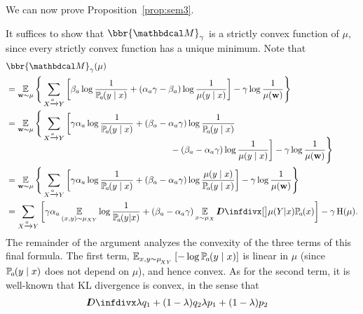 \begin{subappendices}
We can now prove         Proposition~\ref{prop:sem3}.
\begin{lproof}\label{proof:sem3}
It suffices to show that $\bbr{\dg
			  M}_\gamma$ is a strictly convex function of $\mu$,
since every strictly convex function has a unique minimum.
Note that
\begin{align*}
&   \bbr{\dg M}_\gamma(\mu) 
\\	&= \Ex_{\mat w \sim \mu} \Bigg\{   \sum_{ X \xrightarrow{\!\!a} Y  } \left[
		\beta_a \log \frac{1}{\p_a(y\mid x)} + ({\alpha_a}\gamma - \beta_a ) \log \frac{1}{\mu(y \mid x)} \right] - \gamma \log \frac{1}{\mu(\mat w)} \Bigg\} \\
	&= \Ex_{\mat w \sim \mu} \Bigg\{   \sum_{ X \xrightarrow{\!\!a} Y  } \bigg[ \gamma {\alpha_a} \log \frac{1}{\p_a(y\mid x)} + 
		(\beta_a - {\alpha_a} \gamma) \log \frac{1}{\p_a(y\mid x)} \\[-2ex]
        &\hspace{6.5cm}- (\beta_a - {\alpha_a} \gamma) \log \frac{1}{\mu(y \mid x)} \bigg] - \gamma \log \frac{1}{\mu(\mat w)} \Bigg\}  \\
	&= \Ex_{\mat w \sim \mu} \Bigg\{   \sum_{ X \xrightarrow{\!\!a} Y  } \left[ \gamma {\alpha_a} \log \frac{1}{\p_a(y\mid x)} + 
		(\beta_a - {\alpha_a} \gamma) \log \frac{\mu(y\mid x)}{\p_a(y\mid x)} \right] - \gamma \log \frac{1}{\mu(\mat w)} \Bigg\} \\
	&=  \sum_{ X \xrightarrow{\!\!a} Y  } \left[ \gamma {\alpha_a} 
        \Ex_{\vphantom{|}(x,y) \sim \mu_{XY}}
            \log \frac{1}{\p_a(y| x)} + 
		(\beta_a - {\alpha_a} \gamma) \Ex_{x\sim\mu_X}
          \kldiv[\big]{\mu(Y | x)}{\p_a(x)} \right] - \gamma \H(\mu). 
\end{align*}
The remainder of the argument analyzes the convexity of
    the three terms of this final formula. 
The first term, 
\( \Ex_{x,y \sim \mu_{\!_{XY}}} \left[-\log {\p_a(y\mid x)}\right] \) 
is linear in $\mu$ (since $\p_a(y\mid x)$ does not depend on $\mu$), and hence convex. %
As for the second term, it is well-known that KL divergence is convex, in the sense that 
\begin{align*}
    &\kldiv{\lambda q_1 + (1-\lambda) q_2 }{ \lambda p_1 + (1-\lambda) p_2}

\end{align*}
\end{lproof}
\end{subappendices}

